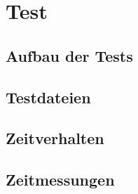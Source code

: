 %
%
%


\chapter{Test}

\section{Aufbau der Tests}

\section{Testdateien}

\section{Zeitverhalten}

\section{Zeitmessungen}

